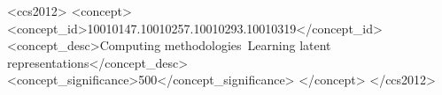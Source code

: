 \documentclass[acmengage]{acmart}
\begin{document}



\newcommand{\benchmarkname}{T-GRAB~}



\begin{CCSXML}
<ccs2012>
<concept>
<concept_id>10010147.10010257.10010293.10010319</concept_id>
<concept_desc>Computing methodologies~Learning latent representations</concept_desc>
<concept_significance>500</concept_significance>
</concept>
</ccs2012>
\end{CCSXML}

\end{document}
